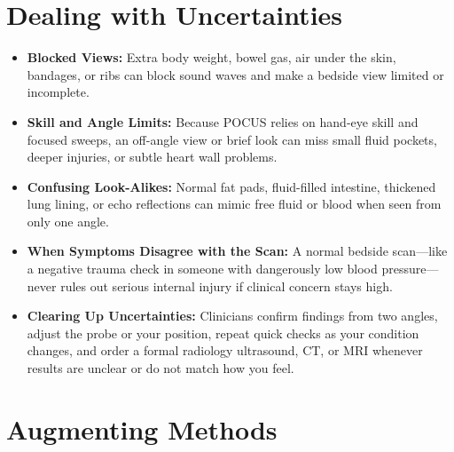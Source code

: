 \section{Dealing with Uncertainties}

\begin{itemize}
    \item \textbf{Blocked Views:} Extra body weight, bowel gas, air under the skin, bandages, or ribs can block sound waves and make a bedside view limited or incomplete.
    \item \textbf{Skill and Angle Limits:} Because POCUS relies on hand-eye skill and focused sweeps, an off-angle view or brief look can miss small fluid pockets, deeper injuries, or subtle heart wall problems.
    \item \textbf{Confusing Look-Alikes:} Normal fat pads, fluid-filled intestine, thickened lung lining, or echo reflections can mimic free fluid or blood when seen from only one angle.
    \item \textbf{When Symptoms Disagree with the Scan:} A normal bedside scan---like a negative trauma check in someone with dangerously low blood pressure---never rules out serious internal injury if clinical concern stays high.
    \item \textbf{Clearing Up Uncertainties:} Clinicians confirm findings from two angles, adjust the probe or your position, repeat quick checks as your condition changes, and order a formal radiology ultrasound, CT, or MRI whenever results are unclear or do not match how you feel.
\end{itemize}

\section{Augmenting Methods}

